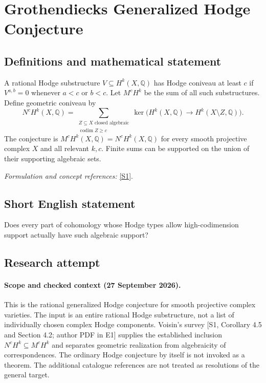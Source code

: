 \documentclass[11pt]{article}
\begin{document}
\section*{\texorpdfstring{Grothendiecks Generalized Hodge Conjecture}{Grothendiecks Generalized Hodge Conjecture}}\label{24}
\subsection{Definitions and mathematical statement}
A rational Hodge substructure $V\subseteq H^k(X,{\mathbb{Q}})$ has Hodge coniveau at least $c$ if $V^{a,b}=0$ whenever $a<c$ or $b<c$. Let $M^cH^k$ be the sum of all such substructures. Define geometric coniveau by
\[
 N^cH^k(X,{\mathbb{Q}})=\sum_{\substack{Z\subseteq X\text{ closed algebraic}\\ \operatorname{codim}Z\ge c}}
 \ker\bigl(H^k(X,{\mathbb{Q}})\to H^k(X\setminus Z,{\mathbb{Q}})\bigr).
\]
The conjecture is $M^cH^k(X,{\mathbb{Q}})=N^cH^k(X,{\mathbb{Q}})$ for every smooth projective complex $X$ and all relevant $k,c$. Finite sums can be supported on the union of their supporting algebraic sets.
\par\smallskip\textit{Formulation and concept references:} \href{https://jomprob.org/index.php/jomp/article/view/Vol-1Issue-1Paper-2}{[S1]}.

\subsection{Short English statement}
Does every part of cohomology whose Hodge types allow high-codimension support actually have such algebraic support?
\subsection{Research attempt}

\paragraph{Scope and checked context (27 September 2026).}
This is the rational generalized Hodge conjecture for smooth projective
 complex varieties. The input is an entire rational Hodge substructure,
 not a list of individually chosen complex Hodge components. Voisin's
 survey [S1, Corollary 4.5 and Section 4.2; author PDF in E1] supplies the
 established inclusion $N^cH^k\subseteq M^cH^k$ and separates geometric
 realization from algebraicity of correspondences. The ordinary Hodge
 conjecture by itself is not invoked as a theorem. The additional
 catalogue references are not treated as resolutions of the general target.
\end{document}
